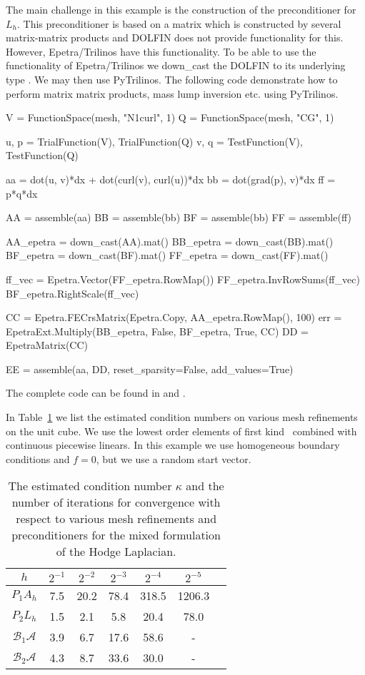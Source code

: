 The main challenge in this example is the construction of the
preconditioner for $L_h$. This preconditioner is based on a matrix
which is constructed by several matrix-matrix products and DOLFIN does
not provide functionality for this. However, Epetra/Trilinos have this
functionality. To be able to use the functionality of Epetra/Trilinos
we down\_cast the DOLFIN  to its underlying
type . We may then use PyTrilinos.  The
following code demonstrate how to perform matrix matrix products, mass
lump inversion etc. using PyTrilinos.
\begin{python}
V = FunctionSpace(mesh, "N1curl", 1)
Q = FunctionSpace(mesh, "CG", 1)

u, p = TrialFunction(V), TrialFunction(Q)
v, q = TestFunction(V), TestFunction(Q)

aa = dot(u, v)*dx + dot(curl(v), curl(u))*dx
bb = dot(grad(p), v)*dx
ff = p*q*dx

AA = assemble(aa)
BB = assemble(bb)
BF = assemble(bb)
FF = assemble(ff)

AA_epetra = down_cast(AA).mat()
BB_epetra = down_cast(BB).mat()
BF_epetra = down_cast(BF).mat()
FF_epetra = down_cast(FF).mat()

ff_vec = Epetra.Vector(FF_epetra.RowMap())
FF_epetra.InvRowSums(ff_vec)
BF_epetra.RightScale(ff_vec)

CC = Epetra.FECrsMatrix(Epetra.Copy, AA_epetra.RowMap(), 100)
err = EpetraExt.Multiply(BB_epetra, False, BF_epetra, True, CC)
DD = EpetraMatrix(CC)

EE = assemble(aa, DD, reset_sparsity=False, add_values=True)
\end{python}
The complete code can be found in  and .

In Table~\ref{table:hodge} we list the estimated condition numbers on
various mesh refinements on the unit cube. We use the lowest
order \nedelec{} elements of first kind~\citep{Nedelec1980a} combined
with continuous piecewise linears. In this example we use homogeneous
boundary conditions and $f=0$, but we use a random start vector.
\begin{table}
\begin{center}
\begin{tabular}{|c||c|c|c|c|c|c|}
\hline
$h$ & $2^{-1}$ & $2^{-2}$ & $2^{-3}$ & $2^{-4}$  & $2^{-5}$ \\ \hline
$ P_1 A_h$ & 7.5 & 20.2 & 78.4 & 318.5 & 1206.3 \\ \hline
$ P_2 L_h$ & 1.5 & 2.1  & 5.8  & 20.4 & 78.0 \\ \hline
$\mathcal{B}_1 \mathcal{A}$ & 3.9 & 6.7 & 17.6 & 58.6 & - \\ \hline
$\mathcal{B}_2 \mathcal{A}$ & 4.3 & 8.7 & 33.6 & 30.0 & - \\ \hline
\end{tabular}
\caption{The estimated condition number $\kappa$ and the number of iterations for
  convergence with respect to various mesh refinements and preconditioners for the mixed formulation of the Hodge Laplacian.}  \label{table:hodge}
\end{center}
\end{table}

